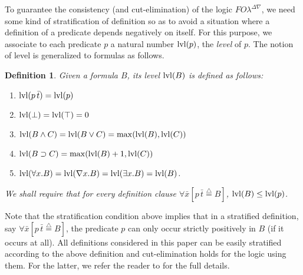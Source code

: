 \documentclass{acmtrans2m}
\newenvironment{definition}{\begin{define} \rm}{\end{define}}
\newtheorem{define}[theorem]{Definition}
\newcommand{\FOL   }{FO\lambda}
\newcommand{\FOLDNb}{\FOL^{\Delta\nabla}}
\newcommand{\defeq}{\mathrel{\stackrel{{\scriptscriptstyle\triangle}}{=}}}
\newcommand{\level}[1]{{\rm lvl}(#1)}
\newcommand{\oimp}{\supset}
\begin{document}
To guarantee the consistency (and cut-elimination) of the logic
$\FOLDNb$, we need some kind of stratification of definition so as to 
avoid a situation where a definition of a predicate depends
negatively on itself. 
For this purpose, we associate to each predicate $p$ a 
natural number $\level{p}$, the {\em level} of $p$.  The notion of
level is generalized to formulas as follows.
\begin{definition}
\label{def:level}
Given a formula $B$, its {\em level} $\level{B}$ is defined as follows:
\begin{enumerate}
\item $\level{p \, \bar{t}} = \level{p}$
\item $\level{\bot} = \level{\top} = 0$
\item $\level{B \land C} = \level{B \lor C} = \max(\level{B},\level{C})$
\item $\level{B \oimp C} = \max(\level{B}+1,\level{C})$
\item $\level{\forall x.B} = \level{\nabla x.B} = \level{\exists x.B}
       = \level{B}$. 
\end{enumerate}
We shall require that for every definition clause $\forall\bar{x}[p
\, \bar{t} \defeq B]$, $\level{B} \leq \level{p}$.  
\end{definition}
Note that the stratification condition above implies that in
a stratified definition, say $\forall \bar x [p\,\bar t \defeq B]$,
the predicate $p$ can only occur strictly positively in $B$ (if it occurs at all).
All definitions considered in this paper can be easily stratified according
to the above definition and cut-elimination holds for the logic using them.
For the latter, we refer the reader to \cite{miller05tocl} for the full details.
\end{document}
